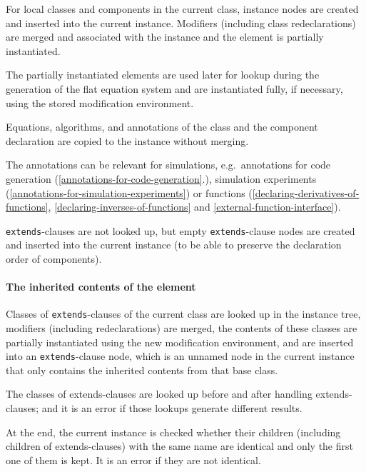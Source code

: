 For local classes and components in the current class, instance nodes
are created and inserted into the current instance. Modifiers (including
class redeclarations) are merged and associated with the instance and
the element is partially instantiated.

\begin{nonnormative}
The partially instantiated elements are used later for lookup during the generation of the flat equation system and are instantiated fully, if necessary, using the
stored modification environment.
\end{nonnormative}

Equations, algorithms, and annotations of the class and the component
declaration are copied to the instance without merging.

\begin{nonnormative}
The annotations can be relevant for simulations, e.g.\ annotations for code generation (\cref{annotations-for-code-generation}.), simulation experiments
(\cref{annotations-for-simulation-experiments}) or functions (\cref{declaring-derivatives-of-functions}, \cref{declaring-inverses-of-functions} and \cref{external-function-interface}).
\end{nonnormative}

\lstinline!extends!-clauses are not looked up, but empty \lstinline!extends!-clause nodes are created and inserted into the current instance (to be able to preserve the declaration order of components).

\paragraph*{The inherited contents of the element}\label{the-inherited-contents-of-the-element}

Classes of \lstinline!extends!-clauses of the current class are looked up in the instance tree, modifiers (including redeclarations) are merged, the contents of these classes are partially instantiated using the new modification environment, and are inserted into an \lstinline!extends!-clause node, which is an unnamed node in the current instance that only contains the inherited contents from that base class.

The classes of extends-clauses are looked up before and after handling
extends-clauses; and it is an error if those lookups generate different
results.

At the end, the current instance is checked whether their children
(including children of extends-clauses) with the same name are identical
and only the first one of them is kept.  It is an error if they are not identical.

